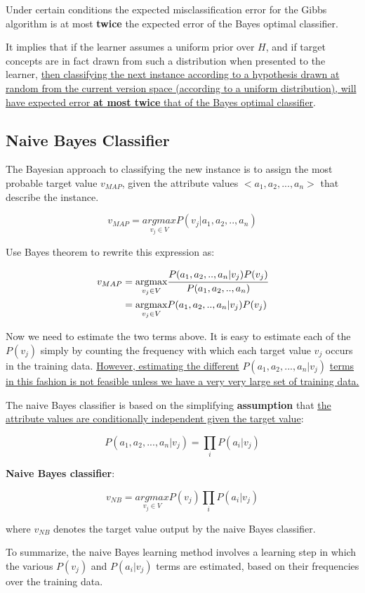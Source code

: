Under certain conditions the expected misclassification error for the
Gibbs algorithm is at most \textbf{twice} the expected error of the
Bayes optimal classifier.

It implies that if the learner assumes a uniform prior over \(H\), and
if target concepts are in fact drawn from such a distribution when
presented to the learner, \ul{then classifying the next instance according to a hypothesis drawn at random from the current version space (according to a uniform distribution), will have expected error \textbf{at most twice} that of the Bayes optimal classifier}.

\hypertarget{naive-bayes-classifier}{%
\subsection{Naive Bayes Classifier}\label{naive-bayes-classifier}}

The Bayesian approach to classifying the new instance is to assign the
most probable target value \(v_{MAP}\), given the attribute values
\(<a_1,a_2,...,a_n>\) that describe the instance.

\[v_{MAP}=\underset{v_j\in V}{argmax}P(v_j|a_1,a_2,..,a_n)\]

Use Bayes theorem to rewrite this expression as:

\begin{equation*}
\begin{aligned}
v_{MAP}&=\underset{v_j\in V}{\text{argmax}}\cfrac{P(a_1,a_2,..,a_n|v_j)P(v_j)}{P(a_1,a_2,..,a_n)}\\
&=\underset{v_j\in V}{\text{argmax}}P(a_1,a_2,..,a_n|v_j)P(v_j)
\end{aligned}
\end{equation*}

Now we need to estimate the two terms above. It is easy to estimate each
of the \(P(v_j)\) simply by counting the frequency with which each
target value \(v_j\) occurs in the training data. \ul{However, estimating the different} \(P(a_1,a_2,...,a_n|v_j)\) \ul{terms in this fashion is not feasible unless we have a very very large set of training data.}

The naive Bayes classifier is based on the simplifying
\textbf{assumption} that \ul{the attribute values are conditionally
independent given the target value}:

\[P(a_1,a_2,...,a_n|v_j)=\prod_i P(a_i|v_j)\]

\textbf{Naive Bayes classifier}:

\[v_{NB}=\underset{v_j\in V}{argmax}P(v_j)\prod_i P(a_i|v_j)\]

where \(v_{NB}\) denotes the target value output by the naive Bayes
classifier.

To summarize, the naive Bayes learning method involves a learning step
in which the various \(P(v_j)\) and \(P(a_i|v_j)\) terms are estimated,
based on their frequencies over the training data.

